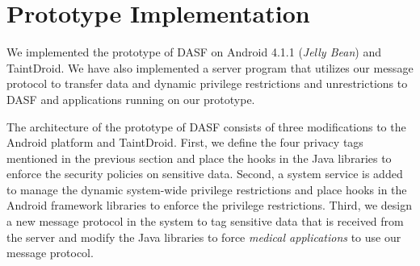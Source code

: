 \section{Prototype Implementation}

We implemented the prototype of DASF on Android 4.1.1
(\textit{Jelly Bean}) and TaintDroid.  We have also implemented a
server program that utilizes our message protocol to transfer data
and dynamic privilege restrictions and unrestrictions to DASF
and applications running on our prototype.  


The architecture of the prototype of DASF consists of three
modifications to the Android platform and TaintDroid. First, we
define the four privacy tags mentioned in the previous section and
place the hooks in the Java libraries to enforce the security policies
on sensitive data.  Second, a system service is added to manage
the dynamic system-wide privilege restrictions and place hooks in the
Android framework libraries to enforce the privilege restrictions.
Third, we design a new message protocol in the system to tag sensitive
data that is received from the server and modify the Java libraries to
force \textit{medical applications} to use our message protocol.


